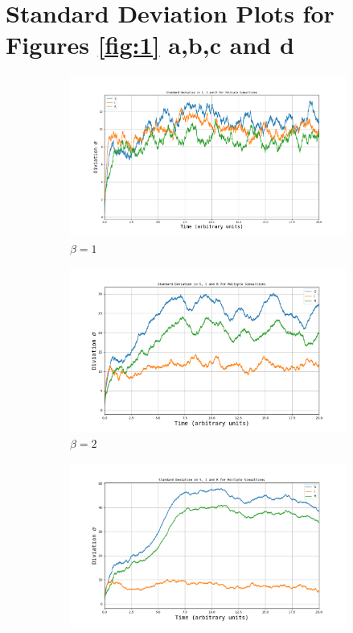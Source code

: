\section{Standard Deviation Plots for Figures \ref{fig:1} a,b,c and d}
\begin{figure}[H]
		\centering
		\begin{subfigure}{0.49\linewidth}
			\includegraphics[width=1.1\linewidth]{Figures/StdDiv_OppgA_4_1_05.png}
			\caption{$\beta = 1$}
		\end{subfigure}
		\begin{subfigure}{0.49\linewidth}
			\includegraphics[width=1.1\linewidth]{Figures/StdDiv_OppgA_4_2_05.png}
			\caption{$\beta = 2$}
		\end{subfigure}
		\begin{subfigure}{0.49\linewidth}
			\includegraphics[width=1.1\linewidth]{Figures/StdDiv_OppgA_4_3_05.png}

\end{subfigure}
\end{figure}
